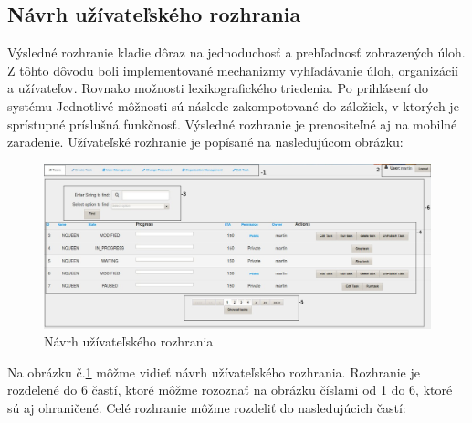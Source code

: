 \subsection{Návrh užívateľského rozhrania}
Výsledné rozhranie kladie dôraz na jednoduchosť a prehľadnosť zobrazených úloh. Z tôhto dôvodu boli implementované mechanizmy vyhľadávanie úloh, organizácií a užívateľov. Rovnako možnosti lexikografického triedenia. Po prihlásení do systému Jednotlivé môžnosti sú následe zakompotované do záložiek, v ktorých je sprístupné príslušná funkčnosť. Výsledné rozhranie je prenositeľné aj na mobilné zaradenie. Užívateľské rozhranie je popísané na nasledujúcom obrázku:
\begin{figure}[htb]

\begin{center}

\includegraphics[scale=0.4]{page_show.jpg} 
\caption{Návrh užívateľského rozhrania}
\label{rozhranie}

\end{center}

\end{figure}
Na obrázku č.\ref{rozhranie} môžme vidieť návrh užívateľského rozhrania. Rozhranie je rozdelené do 6 častí, ktoré môžme rozoznať na obrázku číslami od 1 do 6, ktoré sú aj ohraničené. Celé rozhranie môžme rozdeliť do nasledujúcich častí:
